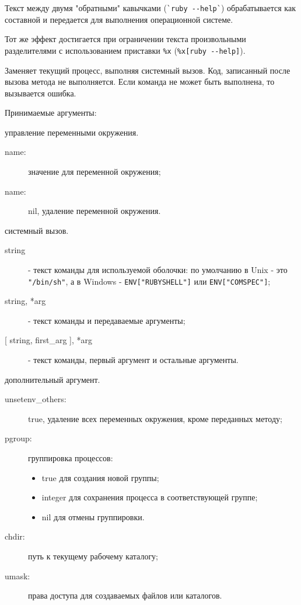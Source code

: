 \begin{methodlist}
  Текст между двумя "обратными" кавычками (\verb!`ruby --help`!) обрабатывается как составной и передается для выполнения операционной системе. 
  
  Тот же эффект достигается при ограничении текста произвольными разделителями с использованием приставки \verb!%x! (\verb!%x[ruby --help]!).

  Заменяет текущий процесс, выполняя системный вызов. Код, записанный после вызова метода не выполняется. Если команда не может быть выполнена, то вызывается ошибка.

  \begin{keylist}{Принимаемые аргументы:}

     управление переменными окружения.
    \begin{description}
      \item[name:] значение для переменной окружения;
      \item[name:] nil, удаление переменной окружения.
    \end{description}

     системный вызов.
    \begin{description}
      \item[string] - текст команды для используемой оболочки: по умолчанию в Unix - это \verb!"/bin/sh"!, а в Windows - \verb!ENV["RUBYSHELL"]! или \verb!ENV["COMSPEC"]!;
      \item[string, *arg] - текст команды и передаваемые аргументы;
      \item[{[ string, first_arg ], *arg}] - текст команды, первый аргумент и остальные аргументы. 
    \end{description}

     дополнительный аргумент.
    \begin{description}
      \item[unsetenv_others:] true, удаление всех переменных окружения, кроме переданных методу;
      \item[pgroup:] группировка процессов:
        \begin{itemize}
          \item true для создания новой группы;
          \item integer для сохранения процесса в соответствующей группе;
          \item nil для отмены группировки.
        \end{itemize}
      \item[chdir:] путь к текущему рабочему каталогу;
      \item[umask:] права доступа для создаваемых файлов или каталогов. 
    \end{description}
  \end{keylist}


\end{methodlist}
